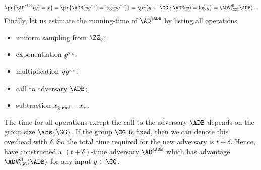 \documentclass{crypto-exercise}
\begin{document}
\begin{solution}
\begin{align*}
\pr{\AD^{\ADB}(y)=x}=\pr{\ADB(yg^{\XS})=\log (y g^{\XS})}=\pr{y\gets\GG:\ADB(y)=\log y}= \ADVDL{\GG}{\ADB}\enspace.
\end{align*}
Finally, let us estimate the running-time of $\AD^\ADB$ by listing all operations 
\begin{itemize}
  \item uniform sampling from $\ZZ_q$;
  \item exponentiation $g^{x_{*}}$;
  \item multiplication $y g^{x_{*}}$;
  \item call to adversary $\ADB$;
  \item subtraction $x_{\text{guess}} - x_{*}$.
\end{itemize}
The time for all operations except the call to the adversary $\ADB$ depends on the group size $\abs{\GG}$. If the group $\GG$ is fixed, then we can denote this overhead with $\delta$. So the total time required for the new adversary is $t+\delta$. Hence,  have constructed a $(t+\delta)$-time adversary $\AD^\ADB$ which has advantage $\ADVDL{\GG}{\ADB}$ for any input $y \in \GG$.


\end{solution}
\end{document}
